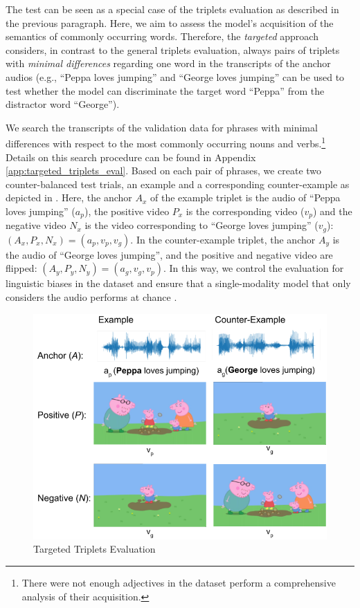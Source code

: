 The test can be seen as a special case of the triplets evaluation as described in the previous paragraph. Here, we aim to assess the model's acquisition of the semantics of commonly occurring words. Therefore, the \textit{targeted} approach considers, in contrast to the general triplets evaluation, always pairs of triplets with \textit{minimal differences} regarding one word in the transcripts of the anchor audios (e.g., ``Peppa loves jumping'' and ``George loves jumping'' can be used to test whether the model can discriminate the target word ``Peppa'' from the distractor word ``George'').


We search the transcripts of the validation data for phrases with minimal differences with respect to the most commonly occurring nouns and verbs.\footnote{There were not enough adjectives in the dataset perform a comprehensive analysis of their acquisition.} Details on this search procedure can be found in Appendix \ref{app:targeted_triplets_eval}. Based on each pair of phrases, we create two counter-balanced test trials, an example and a corresponding counter-example as depicted in . Here, the anchor $A_x$ of the example triplet is the audio of ``Peppa loves jumping'' ($a_p$), the positive video $P_x$ is the corresponding video ($v_p$) and the negative video $N_x$ is the video corresponding to ``George loves jumping'' ($v_g$): $(A_x, P_x, N_x) = (a_p, v_p, v_g)$.
In the counter-example triplet, the anchor $A_y$ is the audio of  ``George loves jumping'', and the positive and negative video are flipped: $(A_y, P_y, N_y) = (a_g, v_g, v_p)$. In this way, we control the evaluation for linguistic biases in the dataset and ensure that a single-modality model that only considers the audio performs at chance \citep{nikolaus-fourtassi-2021-evaluating}.

\begin{figure}
  \centering
  \includegraphics[width=.7\linewidth]{peppa_targeted_triplets.png}
  \caption{Targeted Triplets Evaluation}
  \label{fig:targeted_triplets}
\end{figure}

